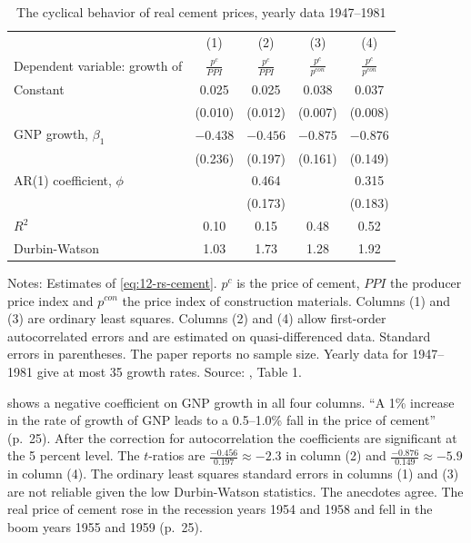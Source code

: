 \begin{table}[htbp]
\centering
\caption{The cyclical behavior of real cement prices, yearly data 1947--1981}\label{tab:12-rs-cement}
\small
\begin{tabular}{@{}lcccc@{}}
\toprule
 & (1) & (2) & (3) & (4)\\
Dependent variable: growth of & $\frac{p^c}{\mathit{PPI}}$ & $\frac{p^c}{\mathit{PPI}}$ & $\frac{p^c}{p^{\mathit{con}}}$ & $\frac{p^c}{p^{\mathit{con}}}$\\
\midrule
Constant & 0.025 & 0.025 & 0.038 & 0.037\\
 & (0.010) & (0.012) & (0.007) & (0.008)\\[2pt]
GNP growth, $\beta_1$ & $-0.438$ & $-0.456$ & $-0.875$ & $-0.876$\\
 & (0.236) & (0.197) & (0.161) & (0.149)\\[2pt]
AR(1) coefficient, $\phi$ & & 0.464 & & 0.315\\
 & & (0.173) & & (0.183)\\[2pt]
$R^2$ & 0.10 & 0.15 & 0.48 & 0.52\\
Durbin-Watson & 1.03 & 1.73 & 1.28 & 1.92\\
\bottomrule
\end{tabular}

\smallskip
\begin{minipage}{0.86\textwidth}
\footnotesize
Notes: Estimates of \eqref{eq:12-rs-cement}. $p^c$ is the price of cement, $\mathit{PPI}$ the producer price index and
$p^{\mathit{con}}$ the price index of construction materials. Columns (1) and (3) are ordinary least squares. Columns (2)
and (4) allow first-order autocorrelated errors and are estimated on quasi-differenced data. Standard errors in
parentheses. The paper reports no sample size. Yearly data for 1947--1981 give at most 35 growth rates. Source:
\citet{RotembergSaloner1984}, Table 1.
\end{minipage}
\end{table}

 shows a negative coefficient on GNP growth in all four columns. ``A 1\% increase in the rate of
growth of GNP leads to a 0.5--1.0\% fall in the price of cement'' (p.~25). After the correction for autocorrelation the
coefficients are significant at the 5 percent level. The $t$-ratios are $\frac{-0.456}{0.197} \approx -2.3$ in column (2)
and $\frac{-0.876}{0.149} \approx -5.9$ in column (4). The ordinary least squares standard errors in columns (1) and (3)
are not reliable given the low Durbin-Watson statistics. The anecdotes agree. The real price of cement rose in the
recession years 1954 and 1958 and fell in the boom years 1955 and 1959 (p.~25).

